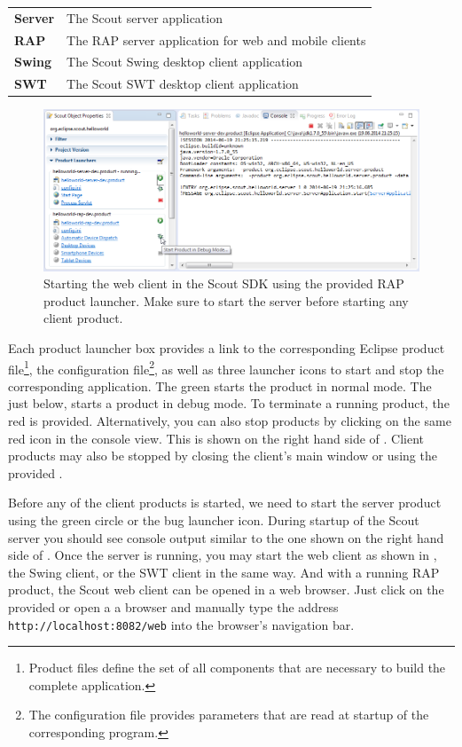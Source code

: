 \documentclass[a4paper,10pt,twoside]{book}
\begin{document}
\begin{tabular}{ l l }
  \textbf{Server} & The Scout server application\\
  \textbf{RAP}    & The RAP server application for web and mobile clients\\
  \textbf{Swing}  & The Scout Swing desktop client application\\
  \textbf{SWT}    & The Scout SWT desktop client application\\
\end{tabular}

\begin{figure}
\includegraphics[width=15cm]{sdk_start_client_product.png} 
\caption{Starting the web client in the Scout SDK using the provided RAP product launcher. Make sure to start the server before starting any client product.}
\end{figure}

Each product launcher box provides a link to the corresponding Eclipse product file\footnote{
Product files define the set of all components that are necessary to build the complete application.
},
the configuration file\footnote{
The configuration file  provides parameters that are read at startup of the corresponding program.
},
as well as three launcher icons to start and stop the corresponding application.
The green  starts the product in normal mode.
The  just below, starts a product in debug mode.
To terminate a running product, the red  is provided. 
Alternatively, you can also stop products by clicking on the same red icon in the console view.
This is shown on the right hand side of .
Client products may also be stopped by closing the client's main window or using the provided .

Before any of the client products is started, we need to start the server product using the green circle or the bug launcher icon.
During startup of the Scout server you should see console output similar to the one shown on the right hand side of .
Once the server is running, you may start the web client as shown in , the Swing client, or the SWT client in the same way.
And with a running RAP product, the Scout web client can be opened in a web browser.
Just click on the provided  or open a a browser and manually type the address \texttt{http://localhost:8082/web} into the browser's navigation bar.
\end{document}
